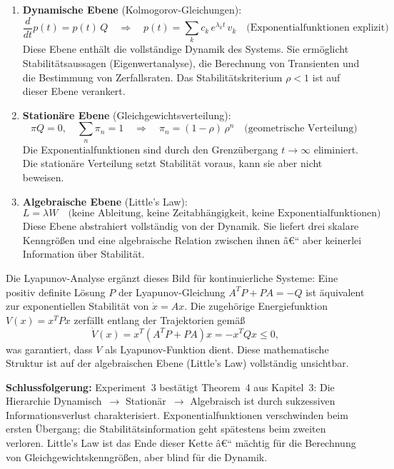 ﻿\documentclass[a4paper,12pt]{scrreprt}
\theoremstyle{definition}
\begin{document}
\begin{enumerate}
	\item \textbf{Dynamische Ebene} (Kolmogorov-Gleichungen):
	\[
	\frac{d}{dt}p(t) = p(t)\,Q
	\quad\Rightarrow\quad
	p(t) = \sum_k c_k\,e^{\lambda_k t}\,v_k
	\quad\text{(Exponentialfunktionen explizit)}
	\]
	Diese Ebene enthält die vollständige Dynamik des Systems.
	Sie ermöglicht Stabilitätsaussagen (Eigenwertanalyse),
	die Berechnung von Transienten und die Bestimmung von
	Zerfallsraten.  Das Stabilitätskriterium $\rho < 1$ ist auf
	dieser Ebene verankert.
	
	\item \textbf{Stationäre Ebene} (Gleichgewichtsverteilung):
	\[
	\pi Q = 0, \quad \sum_n \pi_n = 1
	\quad\Rightarrow\quad
	\pi_n = (1-\rho)\,\rho^n
	\quad\text{(geometrische Verteilung)}
	\]
	Die Exponentialfunktionen sind durch den Grenzübergang
	$t \to \infty$ eliminiert.  Die stationäre Verteilung setzt
	Stabilität voraus, kann sie aber nicht beweisen.
	
	\item \textbf{Algebraische Ebene} (Little's Law):
	\[
	L = \lambda W
	\quad\text{(keine Ableitung, keine Zeitabhängigkeit,
		keine Exponentialfunktionen)}
	\]
	Diese Ebene abstrahiert vollständig von der Dynamik.  Sie
	liefert drei skalare Kenngrößen und eine algebraische
	Relation zwischen ihnen â€“ aber keinerlei Information über
	Stabilität.
	
\end{enumerate}

Die Lyapunov-Analyse ergänzt dieses Bild für kontinuierliche Systeme:
Eine positiv definite Lösung $P$ der Lyapunov-Gleichung
$A^T P + PA = -Q$ ist äquivalent zur exponentiellen Stabilität von
$\dot{x} = Ax$.  Die zugehörige Energiefunktion $V(x) = x^T P x$
zerfällt entlang der Trajektorien gemäß
\[
\dot{V}(x) = x^T(A^T P + PA)x = -x^T Q x \leq 0,
\]
was garantiert, dass $V$ als Lyapunov-Funktion dient.  Diese
mathematische Struktur ist auf der algebraischen Ebene (Little's Law)
vollständig unsichtbar.

\textbf{Schlussfolgerung:} Experiment~3 bestätigt Theorem~4 aus
Kapitel~3: Die Hierarchie Dynamisch~$\to$ Stationär~$\to$ Algebraisch
ist durch sukzessiven Informationsverlust charakterisiert.
Exponentialfunktionen verschwinden beim ersten Übergang; die
Stabilitätsinformation geht spätestens beim zweiten verloren.
Little's Law ist das Ende dieser Kette â€“ mächtig für die Berechnung
von Gleichgewichtskenngrößen, aber blind für die Dynamik.
\end{document}
